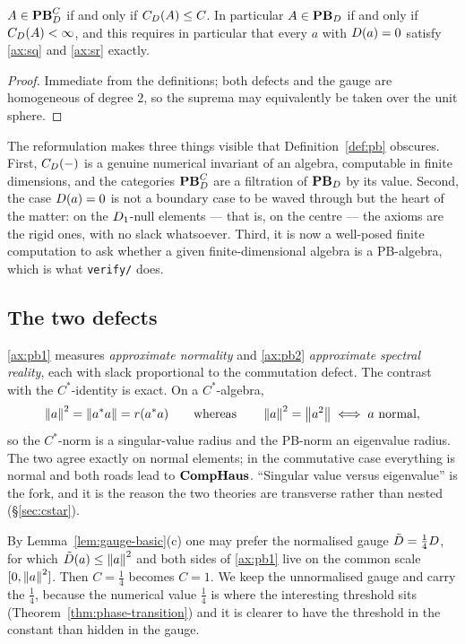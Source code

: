 \begin{lemma}\label{lem:critical-reformulation}
$A\in\mathbf{PB}^C_D$ if and only if $C_D(A)\le C$.  In particular
$A\in\mathbf{PB}_D$ if and only if $C_D(A)<\infty$, and this requires in
particular that every $a$ with $D(a)=0$ satisfy \eqref{ax:sq} and
\eqref{ax:sr} exactly.
\end{lemma}

\begin{proof}
Immediate from the definitions; both defects and the gauge are homogeneous of
degree $2$, so the suprema may equivalently be taken over the unit sphere.
\end{proof}

\begin{remark}
The reformulation makes three things visible that Definition~\ref{def:pb}
obscures.  First, $C_D(-)$ is a genuine numerical invariant of an algebra,
computable in finite dimensions, and the categories $\mathbf{PB}^C_D$ are a
filtration of $\mathbf{PB}_D$ by its value.  Second, the case $D(a)=0$ is not
a boundary case to be waved through but the heart of the matter: on the
$D_1$-null elements --- that is, on the centre --- the axioms are the
rigid ones, with no slack whatsoever.  Third, it is now a well-posed finite
computation to ask whether a given finite-dimensional algebra is a PB-algebra,
which is what \texttt{verify/} does.
\end{remark}

\subsection{The two defects}

\begin{remark}\label{rem:reading}
\eqref{ax:pb1} measures \emph{approximate normality} and \eqref{ax:pb2}
\emph{approximate spectral reality}, each with slack proportional to the
commutation defect.  The contrast with the $C^*$-identity is exact.  On a
$C^*$-algebra,
\[
  \left\lVert a\right\rVert^2=\left\lVert a^*a\right\rVert=r(a^*a)
  \qquad\text{whereas}\qquad
  \left\lVert a\right\rVert^2=\left\lVert a^2\right\rVert\iff a\ \text{normal},
\]
so the $C^*$-norm is a singular-value radius and the PB-norm an eigenvalue
radius.  The two agree exactly on normal elements; in the commutative case
everything is normal and both roads lead to $\mathbf{CompHaus}$.  ``Singular value
versus eigenvalue'' is the fork, and it is the reason the two theories are
transverse rather than nested (\S\ref{sec:cstar}).
\end{remark}

\begin{convention}[Normalisation]\label{conv:normalisation}
By Lemma~\ref{lem:gauge-basic}(c) one may prefer the normalised gauge
$\tilde{D}=\tfrac14D$, for which $\tilde{D}(a)\le\left\lVert a\right\rVert^2$ and
both sides of \eqref{ax:pb1} live on the common scale $[0,\left\lVert a\right\rVert^2]$.  Then
$C=\tfrac14$ becomes $C=1$.  We keep the unnormalised gauge and carry the
$\tfrac14$, because the numerical value $\tfrac14$ is where the interesting
threshold sits (Theorem~\ref{thm:phase-transition}) and it is clearer to have
the threshold in the constant than hidden in the gauge.
\end{convention}
